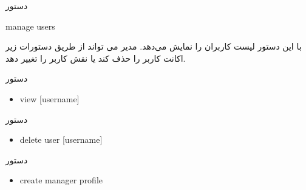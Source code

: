 \documentclass[]{article}
\begin{document}
\hrulefill


\begin{mybox}[colback=yellow]{دستور}

\begin{latin}

manage users

\end{latin}

\end{mybox}


با این دستور لیست کاربران را نمایش می‌دهد. مدیر می تواند از طریق دستورات زیر اکانت کاربر را حذف کند یا نقش کاربر را تغییر دهد.

\begin{mybox}[colback=brilliantlavender]{دستور}


\begin{latin}

\begin{itemize}[label = {$\Rightarrow$}]

\item
view [username]

\end{itemize}

\end{latin}

\end{mybox}




\begin{mybox}[colback=brilliantlavender]{دستور}


\begin{latin}

\begin{itemize}[label = {$\Rightarrow$}]

\item
delete user [username]

\end{itemize}

\end{latin}

\end{mybox}


\begin{mybox}[colback=brilliantlavender]{دستور}


\begin{latin}

\begin{itemize}[label = {$\Rightarrow$}]

\item
create manager profile

\end{itemize}

\end{latin}

\end{mybox}
\end{document}
